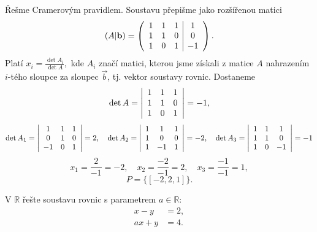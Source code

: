 \begin{reseni}
Řešme Cramerovým pravidlem. Soustavu přepišme jako rozšířenou matici
$$
(A | \vec b) = \left(\begin{array}{c c c | c}
    1 & 1&1 &1\\
    1 &1 &0 &0\\
    1 &0 &1 &-1
\end{array}\right).
$$
Platí $x_i=\frac{\det A_i}{\det A},$ kde $A_i$ značí matici, kterou jsme získali
z matice $A$ nahrazením $i$-tého sloupce za sloupec $\vec b$, tj. vektor  soustavy rovnic.
Dostaneme
$$\det A = \left|\begin{array}{c c c}
    1 & 1&1\\
    1 &1 &0\\
    1 &0 &1
\end{array}\right|=-1,$$
$$\det A_1 = \left|\begin{array}{c c c}
    1 & 1&1\\
    0 &1 &0\\
    -1 &0 &1
\end{array}\right| = 2,\quad \det A_2 = \left|\begin{array}{c c c}
    1 & 1&1\\
    1 &0 &0\\
    1 &-1 &1
\end{array}\right| = -2,\quad \det A_3 = \left|\begin{array}{c c c}
    1 & 1&1\\
    1 &1 &0\\
    1 &0 &-1
\end{array}\right|=-1$$
$$x_1 = \frac{2}{-1}=-2,\quad x_2 = \frac{-2}{-1} = 2,\quad x_3 = \frac{-1}{-1} = 1,$$
$$P=\{[-2,2,1]\}.$$
\end{reseni}

\begin{priklad}
V $\mathbb R$ řešte soustavu rovnic s parametrem $a \in \mathbb R$:
\begin{align*}
    x-y &=2,\\
    ax+y &=4.
\end{align*}
\end{priklad}


